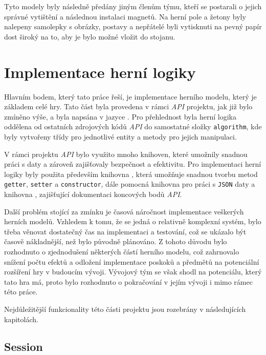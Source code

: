 Tyto modely byly následně předány jiným členům týmu, kteří se postarali o jejich správné vytištění a následnou instalaci magnetů. Na herní pole a žetony byly nalepeny samolepky s obrázky, postavy a nepřátelé byli vytisknuti na pevný papír dost široký na to, aby je bylo možné vložit do stojanu.

\section{Implementace herní logiky}
\label{sec:game_logic}

Hlavním bodem, který tato práce řeší, je implementace herního modelu, který je základem celé hry. Tato část byla provedena v rámci \textit{API} projektu, jak již bylo zmíněno výše, a byla napsána v jazyce . Pro přehlednost byla herní logika oddělena od ostatních zdrojových kódů \textit{API} do samostatné složky \texttt{algorithm}, kde byly vytvořeny třídy pro jednotlivé entity a metody pro jejich manipulaci.

V rámci projektu \textit{API} bylo využito mnoho knihoven, které umožnily snadnou práci s daty a zároveň zajišťovaly bezpečnost a efektivitu. Pro implementaci herní logiky byly použita především knihovna , která umožňuje snadnou tvorbu metod \texttt{getter}, \texttt{setter} a \texttt{constructor}, dále pomocná knihovna  pro práci s \texttt{JSON} daty a knihovna , zajišťující dokumentaci koncových bodů \textit{API}.

Další problém stojící za zmínku je časová náročnost implementace veškerých herních modelů. Vzhledem k tomu, že se jedná o relativně komplexní systém, bylo třeba věnovat dostatečný čas na implementaci a testování, což se ukázalo být časově nákladnější, než bylo původně plánováno. Z tohoto důvodu bylo rozhodnuto o zjednodušení některých částí herního modelu, což zahrnovalo snížení počtu efektů a odložení implementace poskoků a předmětů na potenciální rozšíření hry v budoucím vývoji. Vývojový tým se však shodl na potenciálu, který tato hra má, proto bylo rozhodnuto o pokračování v jejím vývoji i mimo rámec této práce.

Nejdůležitější funkcionality této části projektu jsou rozebrány v následujících kapitolách.

\subsection{Session}
\label{subsec:impl_session}

